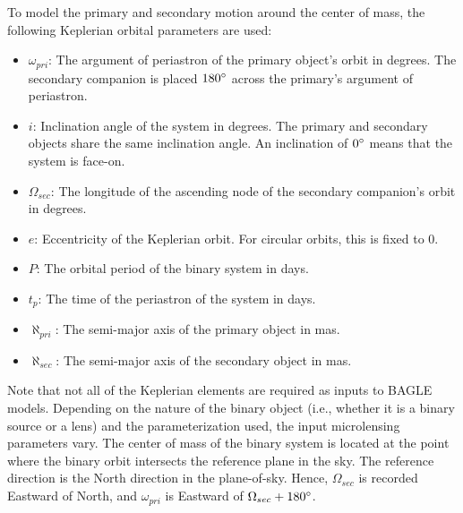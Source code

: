 \documentclass[twocolumn]{aastex701}
\newcommand{\tnot}{t_{0,\sun}}
\newcommand{\w}{\omega_{pri}}
\newcommand{\bigomega}{\Omega_{sec}}
\newcommand{\inclination}{\textit{i}}
\newcommand{\eccentricity}{\textit{e}}
\newcommand{\period}{\textit{P}}
\newcommand{\al}{\aleph_{pri}}
\newcommand{\ala}{\aleph_{sec}}
\begin{document}
To model the primary and secondary motion around the center of mass, the following Keplerian orbital parameters are used: 



\begin{itemize}
\label{keplerian_elems}
    \item $\w$: The argument of periastron of the primary object's orbit in degrees. The secondary companion is placed $180 \degree$ across the primary's argument of periastron. 
    \item $\inclination$: Inclination angle of the system in degrees. The primary and secondary objects share the same inclination angle.  An inclination of $0\degree$ means that the system is face-on.
    \item $\bigomega$: The longitude of the ascending node of the secondary companion's orbit in degrees. 
    \item $\eccentricity$: Eccentricity of the Keplerian orbit. For circular orbits, this is fixed to 0. 
    \item $\period$: The orbital period of the binary system in days. 
    \item $t_p$: The time of the periastron of the system in days. 
    \item $\al$: The semi-major axis of the primary object in mas.
    \item $\ala$: The semi-major axis of the secondary object in mas. 
\end{itemize}

Note that not all of the Keplerian elements are required as inputs to BAGLE models. Depending on the nature of the binary object (i.e., whether it is a binary source or a lens) and the parameterization used, the input microlensing parameters vary. The center of mass of the binary system is located at the point where the binary orbit intersects the reference plane in the sky.
The reference direction is the North direction in the plane-of-sky. Hence, $\bigomega$ is recorded Eastward of North, and $\w$ is Eastward of $\bigomega + 180 \degree$. 
\end{document}
